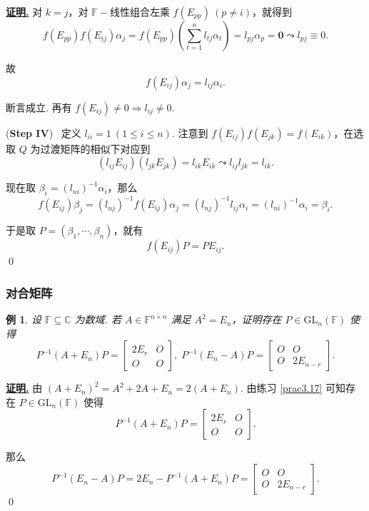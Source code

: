 \documentclass[10pt,openany]{article}
\theoremstyle{thmstyle} %
\theoremstyle{defstyle} %
\theoremstyle{prostyle} %
\theoremstyle{exastyle}
\newtheorem{example}[theorem]{例}
\theoremstyle{remstyle}
\renewenvironment{proof}[1][证明]{\par\underline{\textbf{#1.}} \;\fangsong}{\qed\par}
\newcommand{\F}{\mathbb{F}}
\newcommand{\gfn}{\text{GL}_n(\mathbb{F})}
\newcommand{\C}{\mathbb{C}}
\newcommand{\n}{^{n \times n}}
\begin{document}
\begin{proof}
    对 \( k=j \)，对 \( \F-\)线性组合左乘 \( f(E_{pp}) \ (p \neq i) \)，就得到
    \[ f(E_{pp})f(E_{ij})\alpha_j=f(E_{pp}) \left( \sum_{t=1}^{n} l_{tj} \alpha_t \right)=l_{pj} \alpha_p=\bm{0} \leadsto l_{pj} \equiv 0. \]
    
    故
    \[ f(E_{ij})\alpha_j= l_{ij} \alpha_i. \]
    
    断言成立. 再有 \( f(E_{ij}) \neq 0 \Rightarrow l_{ij} \neq 0 \).
    
    (\textbf{Step IV}) \ 定义 \( l_{ii}=1 \ (1 \leq i \leq n) \). 注意到 \( f(E_{ij})f(E_{jk})=f(E_{ik}) \)，在选取 \( Q \) 为过渡矩阵的相似下对应到 
    \[ (l_{ij} E_{ij})(l_{jk} E_{jk})= l_{ik} E_{ik} \leadsto l_{ij}l_{jk}=l_{ik}. \]
    
    现在取 \( \beta_i= (l_{ni})^{-1} \alpha_i \)，那么
    \[ f(E_{ij}) \beta_j= (l_{nj})^{-1} f(E_{ij}) \alpha_j = (l_{nj})^{-1} l_{ij} \alpha_i= (l_{ni})^{-1} \alpha_i= \beta_i. \]
    
    于是取 \( P=(\beta_1,\cdots,\beta_n) \)，就有 
    \[ f(E_{ij})P=PE_{ij}. \]
\end{proof}


\subsubsection{对合矩阵}

\begin{example} \label{3.4.14}
	设 \( \F \subseteq \C \) 为数域. 若 \( A \in \F\n \) 满足 \( A^2=E_n \)，证明存在 \( P \in \gfn \) 使得
	\[ P^{-1}(A+E_n)P=\begin{bmatrix}
		2E_r & O \\
		O & O
	\end{bmatrix}, \; P^{-1}(E_n-A)P=\begin{bmatrix}
	O & O \\
	O & 2E_{n-r}
	\end{bmatrix}. \]
\end{example}

\begin{proof}
    由 \( (A+E_n)^2=A^2+2A+E_n=2(A+E_n) \). 由练习 \ref{prac3.17} 可知存在 \( P \in \gfn  \) 使得
    \[ P^{-1}(A+E_n)P=\begin{bmatrix}
    	2E_r & O \\
    	O & O
    \end{bmatrix}. \]
    
    那么
    \[ P^{-1}(E_n-A)P=2E_n-P^{-1}(A+E_n)P=\begin{bmatrix}
    	O & O \\
    	O & 2E_{n-r}
    \end{bmatrix}. \]
\end{proof}
\end{document}

